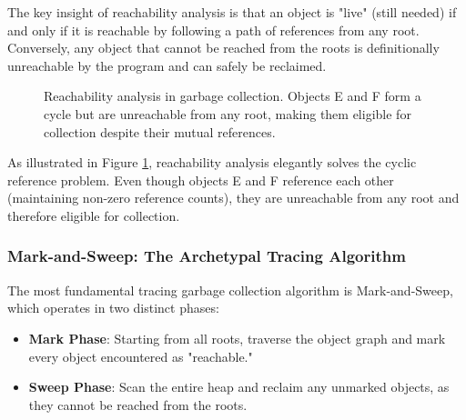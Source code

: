 The key insight of reachability analysis is that an object is "live" (still needed) if and only if it is reachable by following a path of references from any root. Conversely, any object that cannot be reached from the roots is definitionally unreachable by the program and can safely be reclaimed.

\begin{figure}[h]
\centering
{}
\caption{Reachability analysis in garbage collection. Objects E and F form a cycle but are unreachable from any root, making them eligible for collection despite their mutual references.}
\label{fig:reachability}
\end{figure}

As illustrated in Figure \ref{fig:reachability}, reachability analysis elegantly solves the cyclic reference problem. Even though objects E and F reference each other (maintaining non-zero reference counts), they are unreachable from any root and therefore eligible for collection.

\subsubsection{Mark-and-Sweep: The Archetypal Tracing Algorithm}

The most fundamental tracing garbage collection algorithm is Mark-and-Sweep, which operates in two distinct phases:

\begin{itemize}
    \item \textbf{Mark Phase}: Starting from all roots, traverse the object graph and mark every object encountered as "reachable."
    \item \textbf{Sweep Phase}: Scan the entire heap and reclaim any unmarked objects, as they cannot be reached from the roots.
\end{itemize}

